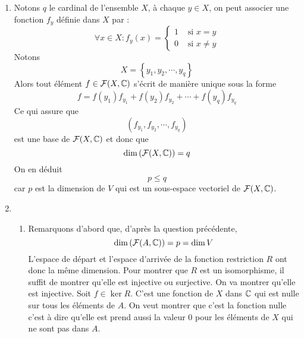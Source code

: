\begin{enumerate}
 \item Notons $q$ le cardinal de l'ensemble $X$, à chaque $y\in X$, on peut associer une fonction $f_y$ définie dans $X$ par :
\begin{displaymath}
 \forall x\in X : f_y(x)=
\left\lbrace
\begin{aligned}
 1 &\text{ si } x=y \\
 0 &\text{ si } x\neq y 
\end{aligned}
\right. 
\end{displaymath}
Notons
\begin{displaymath}
 X = \left\lbrace y_1,y_2,\cdots, y_q\right\rbrace 
\end{displaymath}
Alors tout élément $f\in\mathcal F(X,\mathbb{C})$ s'écrit de manière unique sous la forme
\begin{displaymath}
 f = f(y_1)f_{y_1}+f(y_2)f_{y_2}+ \cdots + f(y_q)f_{y_q}
\end{displaymath}
Ce qui assure que
\begin{displaymath}
 \left( f_{y_1},f_{y_2}, \cdots , f_{y_q} \right) 
\end{displaymath}
est une base de $\mathcal F(X,\mathbb{C})$ et donc que
\begin{displaymath}
 \dim \left( \mathcal F(X,\mathbb{C}) \right) = q
\end{displaymath}
On en déduit
\begin{displaymath}
 p\leq q
\end{displaymath}
car $p$ est la dimension de $V$ qui est un sous-espace vectoriel de $\mathcal F(X,\mathbb{C})$.
\item \begin{enumerate}
 \item Remarquons d'abord que, d'après la question précédente,
\begin{displaymath}
\dim \left( \mathcal F(A,\mathbb{C})\right) =p=\dim V 
\end{displaymath}
L'espace de départ et l'espace d'arrivée de la fonction restriction $R$ ont donc la même dimension.\newline
Pour montrer que $R$ est un isomorphisme, il suffit de montrer qu'elle est injective ou surjective. On va montrer qu'elle est injective.\newline
Soit $f\in \ker R$. C'est une fonction de $X$ dans $\mathbb{C}$ qui est nulle sur tous les éléments de $A$. On veut montrer que c'est la fonction nulle c'est à dire qu'elle est prend aussi la valeur $0$ pour les éléments de $X$ qui ne sont pas dans $A$.\newline

\end{enumerate}
\end{enumerate}
